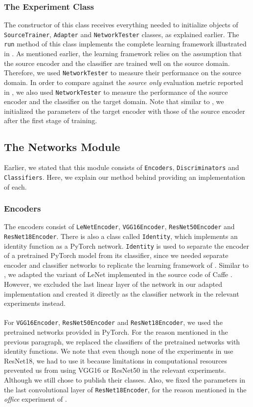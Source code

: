 \documentclass[14pt]{extarticle}
\begin{document}
		\subsubsection{The Experiment Class}
		The constructor of this class receives everything needed to initialize objects of \texttt{SourceTrainer}, \texttt{Adapter} and \texttt{NetworkTester} classes, as explained earlier. The \texttt{run} method of this class implements the complete learning framework illustrated in \cite{adda}. As mentioned earlier, the learning framework relies on the assumption that the source encoder and the classifier are trained well on the source domain. Therefore, we used \texttt{NetworkTester} to measure their performance on the source domain. In order to compare against the \textit{source only} evaluation metric reported in \cite{adda}, we also used \texttt{NetworkTester} to measure the performance of the source encoder and the classifier on the target domain. Note that similar to \cite{adda}, we initialized the parameters of the target encoder with those of the source encoder after the first stage of training.
		\subsection{The Networks Module}
		Earlier, we stated that this module consists of \texttt{Encoders}, \texttt{Discriminators} and \texttt{Classifiers}. Here, we explain our method behind providing an implementation of each.
		\subsubsection{Encoders}
		The encoders consist of \texttt{LeNetEncoder}, \texttt{VGG16Encoder}, \texttt{ResNet50Encoder} and \texttt{ResNet18Encoder}. There is also a class called \texttt{Identity}, which implements an identity function as a PyTorch network. \texttt{Identity} is used to separate the encoder of a pretrained PyTorch model from its classifier, since we needed separate encoder and classifier networks to replicate the learning framework of \cite{adda}. Similar to \cite{adda}, we adapted the variant of LeNet implemented in the source code of Caffe \cite{CaffeLeNet}. However, we excluded the last linear layer of the network in our adapted implementation and created it directly as the classifier network in the relevant experiments instead.\\\\
		For \texttt{VGG16Encoder}, \texttt{ResNet50Encoder} and \texttt{ResNet18Encoder}, we used the pretrained networks provided in PyTorch. For the reason mentioned in the previous paragraph, we replaced the classifiers of the pretrained networks with identity functions. We note that even though none of the experiments in \cite{adda} use ResNet18, we had to use it because limitations in computational resources prevented us from using VGG16 or ResNet50 in the relevant experiments. Although we still chose to publish their classes. Also, we fixed the parameters in the last convolutional layer of \texttt{ResNet18Encoder}, for the reason mentioned in the \textit{office} experiment of \cite{adda}.
\end{document}
